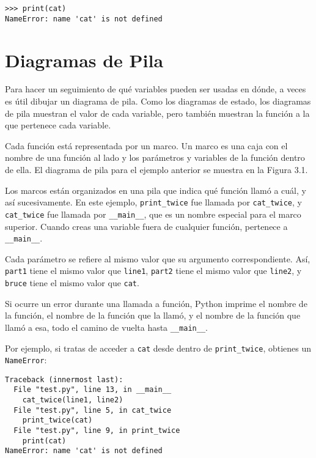 \documentclass[12pt,letterpaper]{book}
\begin{document}
\begin{lstlisting}
>>> print(cat)
NameError: name 'cat' is not defined
\end{lstlisting}


\section{Diagramas de Pila}

Para hacer un seguimiento de qué variables pueden ser usadas en dónde, a veces es útil dibujar un diagrama de pila. Como los diagramas de estado, los diagramas de pila muestran el valor de cada variable, pero también muestran la función a la que pertenece cada variable.

Cada función está representada por un marco. Un marco es una caja con el nombre de una función al lado y los parámetros y variables de la función dentro de ella. El diagrama de pila para el ejemplo anterior se muestra en la Figura 3.1.

Los marcos están organizados en una pila que indica qué función llamó a cuál, y así sucesivamente. En este ejemplo, \texttt{print\_twice} fue llamada por \texttt{cat\_twice}, y \texttt{cat\_twice} fue llamada por \texttt{\_\_main\_\_}, que es un nombre especial para el marco superior. Cuando creas una variable fuera de cualquier función, pertenece a \texttt{\_\_main\_\_}.

Cada parámetro se refiere al mismo valor que su argumento correspondiente. Así, \texttt{part1} tiene el mismo valor que \texttt{line1}, \texttt{part2} tiene el mismo valor que \texttt{line2}, y \texttt{bruce} tiene el mismo valor que \texttt{cat}.

Si ocurre un error durante una llamada a función, Python imprime el nombre de la función, el nombre de la función que la llamó, y el nombre de la función que llamó a esa, todo el camino de vuelta hasta \texttt{\_\_main\_\_}.

Por ejemplo, si tratas de acceder a \texttt{cat} desde dentro de \texttt{print\_twice}, obtienes un \texttt{NameError}:

\begin{lstlisting}
Traceback (innermost last):
  File "test.py", line 13, in __main__
    cat_twice(line1, line2)
  File "test.py", line 5, in cat_twice
    print_twice(cat)
  File "test.py", line 9, in print_twice
    print(cat)
NameError: name 'cat' is not defined
\end{lstlisting}
\end{document}
